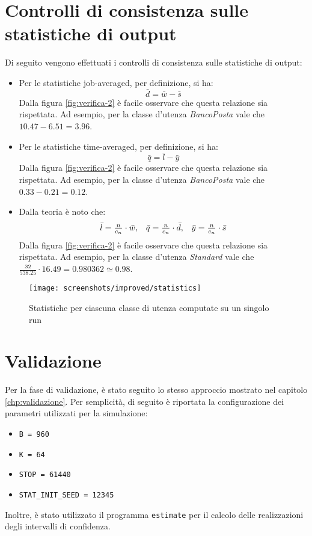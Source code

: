 \section{Controlli di consistenza sulle statistiche di output}
Di seguito vengono effettuati i controlli di consistenza sulle statistiche di output:
\begin{itemize}
\item Per le statistiche job-averaged, per definizione, si ha:
\begin{equation}
\bar{d} = \bar{w} - \bar{s}
\end{equation}
Dalla figura \ref{fig:verifica-2} è facile osservare che questa relazione sia rispettata. Ad esempio, per la classe d'utenza \uo{} \textsl{BancoPosta} vale che $\mathtt{10.47 - 6.51 = 3.96}$.
\item Per le statistiche time-averaged, per definizione, si ha:
\begin{equation}
\bar{q} = \bar{l} - \bar{y}
\end{equation}
Dalla figura \ref{fig:verifica-2} è facile osservare che questa relazione sia rispettata. Ad esempio, per la classe d'utenza \uo{} \textsl{BancoPosta} vale che $\mathtt{0.33 - 0.21 = 0.12}$.
\item Dalla teoria è noto che:
\begin{equation}
\begin{array}{c c c}
\bar{l} = \frac{n}{c_n} \cdot \bar{w}, & \bar{q} = \frac{n}{c_n} \cdot \bar{d}, & \bar{y} = \frac{n}{c_n} \cdot \bar{s} 
\end{array}
\end{equation}
Dalla figura \ref{fig:verifica-2} è facile osservare che questa relazione sia rispettata. Ad esempio, per la classe d'utenza \pp{} \textsl{Standard} vale che $\mathtt{\frac{32}{538.25} \cdot 16.49 = 0.980362 \simeq 0.98}$.
\end{itemize}

\begin{figure}[ht]  
\centering 
\texttt{[image: screenshots/improved/statistics]}
\caption{Statistiche per ciascuna classe di utenza computate su un singolo run}   
\label{fig:miglioria-verifica-3}
\end{figure}

\section{Validazione}\label{sec:miglioria-validazione}
Per la fase di validazione, è stato seguito lo stesso approccio mostrato nel capitolo \ref{chp:validazione}. Per semplicità, di seguito è riportata la configurazione dei parametri utilizzati per la simulazione:
\begin{itemize}
\item \texttt{B = 960}
\item \texttt{K = 64}
\item \texttt{STOP = 61440}
\item \texttt{STAT\_INIT\_SEED = 12345}
\end{itemize}
Inoltre, è stato utilizzato il programma \texttt{estimate} per il calcolo delle realizzazioni degli intervalli di confidenza.


